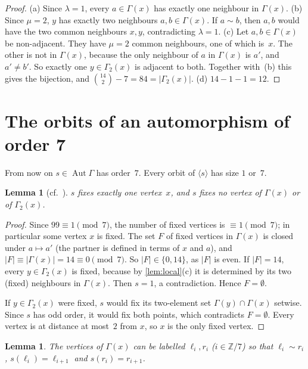 \documentclass[11pt,a4paper]{amsart}
\newtheorem{lemma}[theorem]{Lemma}
\theoremstyle{definition}
\theoremstyle{remark}
\newcommand{\Z}{\mathbb{Z}}
\DeclareMathOperator{\Aut}{Aut}
\begin{document}
\begin{proof}
(a) Since $\lambda=1$, every $a\in\Gamma(x)$ has exactly one neighbour in $\Gamma(x)$.
(b) Since $\mu=2$, $y$ has exactly two neighbours $a,b\in\Gamma(x)$. If $a\sim b$, then $a,b$ would have the
two common neighbours $x,y$, contradicting $\lambda=1$.
(c) Let $a,b\in\Gamma(x)$ be non-adjacent. They have $\mu=2$ common neighbours, one of which is~$x$. The
other is not in $\Gamma(x)$, because the only neighbour of $a$ in $\Gamma(x)$ is $a'$, and $a'\ne b'$.
So exactly one $y\in\Gamma_2(x)$ is adjacent to both. Together with~(b) this gives the bijection, and
$\binom{14}{2}-7=84=|\Gamma_2(x)|$.
(d) $14-1-1=12$.
\end{proof}

\section{The orbits of an automorphism of order 7}\label{sec:orbits}

From now on $s\in\Aut\Gamma$ has order~$7$. Every orbit of $\langle s\rangle$ has size $1$ or~$7$.

\begin{lemma}[cf.~\cite{CW}]\label{lem:fixed}
$s$ fixes exactly one vertex~$x$, and $s$ fixes no vertex of $\Gamma(x)$ or of $\Gamma_2(x)$.
\end{lemma}

\begin{proof}
Since $99\equiv1\pmod 7$, the number of fixed vertices is $\equiv1\pmod7$; in particular some vertex $x$ is
fixed. The set $F$ of fixed vertices in $\Gamma(x)$ is closed under $a\mapsto a'$ (the partner is defined
in terms of $x$ and $a$), and $|F|\equiv|\Gamma(x)|=14\equiv0\pmod7$. So $|F|\in\{0,14\}$, as $|F|$ is
even. If $|F|=14$, every $y\in\Gamma_2(x)$ is fixed, because by \cref{lem:local}(c) it is determined by
its two (fixed) neighbours in $\Gamma(x)$. Then $s=1$, a contradiction. Hence $F=\emptyset$.

If $y\in\Gamma_2(x)$ were fixed, $s$ would fix its two-element set $\Gamma(y)\cap\Gamma(x)$ setwise. Since
$s$ has odd order, it would fix both points, which contradicts $F=\emptyset$. Every vertex is at distance
at most~$2$ from $x$, so $x$ is the only fixed vertex.
\end{proof}

\begin{lemma}\label{lem:labels}
The vertices of $\Gamma(x)$ can be labelled $\ell_i,r_i$ ($i\in\Z/7$) so that $\ell_i\sim r_i$,
$s(\ell_i)=\ell_{i+1}$ and $s(r_i)=r_{i+1}$.
\end{lemma}
\end{document}

